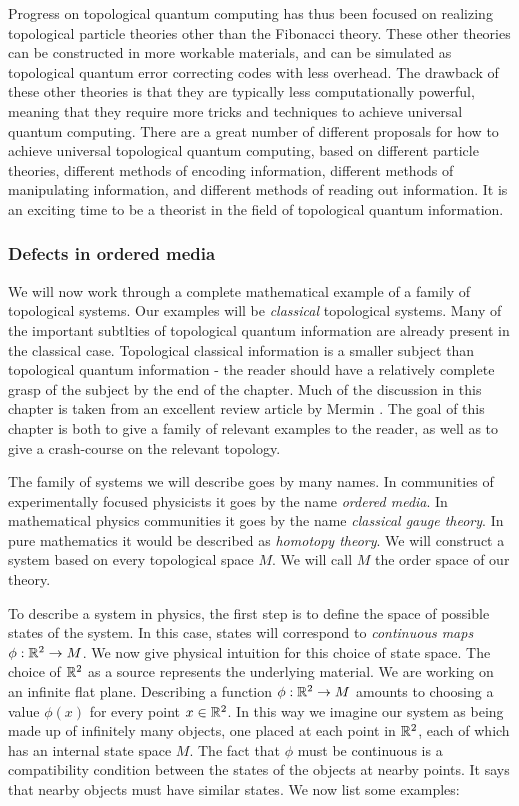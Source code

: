 \documentclass{article}
\theoremstyle{definition}
\numberwithin{figure}{section}
\begin{document}
Progress on topological quantum computing has thus been focused on realizing topological particle theories other than the Fibonacci theory. These other theories can be constructed in more workable materials, and can be simulated as topological quantum error correcting codes with less overhead. The drawback of these other theories is that they are typically less computationally powerful, meaning that they require more tricks and techniques to achieve universal quantum computing. There are a great number of different proposals for how to achieve universal topological quantum computing, based on different particle theories, different methods of encoding information, different methods of manipulating information, and different methods of reading out information. It is an exciting time to be a theorist in the field of topological quantum information.

\subsubsection{Defects in ordered media}

We will now work through a complete mathematical example of a family of topological systems. Our examples will be \textit{classical} topological systems. Many of the important subtlties of topological quantum information are already present in the classical case. Topological classical information is a smaller subject than topological quantum information - the reader should have a relatively complete grasp of the subject by the end of the chapter. Much of the discussion in this chapter is taken from an excellent review article by Mermin \cite{mermin1979topological}. The goal of this chapter is both to give a family of relevant examples to the reader, as well as to give a crash-course on the relevant topology.

The family of systems we will describe goes by many names. In communities of experimentally focused physicists it goes by the name \textit{ordered media}. In mathematical physics communities it goes by the name \textit{classical gauge theory}. In pure mathematics it would be described as \textit{homotopy theory}. We will construct a system based on every topological space $M$. We will call $M$ the order space of our theory.

To describe a system in physics, the first step is to define the space of possible states of the system. In this case, states will correspond to \textit{continuous maps $\phi: \mathbb{R}^2\to M$}. We now give physical intuition for this choice of state space. The choice of $\mathbb{R}^2$ as a source represents the underlying material. We are working on an infinite flat plane. Describing a function $\phi: \mathbb{R}^2\to M$ amounts to choosing a value $\phi(x)$ for every point $x\in \mathbb{R}^2$. In this way we imagine our system as being made up of infinitely many objects, one placed at each point in $\mathbb{R}^2$, each of which has an internal state space $M$. The fact that $\phi$ must be continuous is a compatibility condition between the states of the objects at nearby points. It says that nearby objects must have similar states. We now list some examples:
\end{document}
